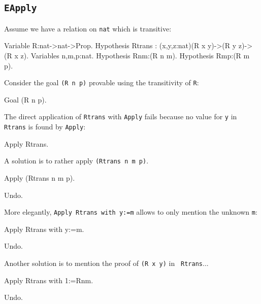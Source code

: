 \begin{coq_example*}
\section{\tt EApply}
\label{EApply-example}
\Example
Assume we have a relation on {\tt nat} which is transitive:

\begin{coq_example*}
Variable R:nat->nat->Prop.
Hypothesis Rtrans : (x,y,z:nat)(R x y)->(R y z)->(R x z).
Variables n,m,p:nat.
Hypothesis Rnm:(R n m).
Hypothesis Rmp:(R m p).
\end{coq_example*}

Consider the goal {\tt (R n p)} provable using the transitivity of
{\tt R}:

\begin{coq_example*}
Goal (R n p).
\end{coq_example*}

The direct application of {\tt Rtrans} with {\tt Apply} fails because
no value for {\tt y} in {\tt Rtrans} is found by {\tt Apply}:

\begin{coq_example}
Apply Rtrans.
\end{coq_example}

A solution is to rather apply {\tt (Rtrans n m p)}.

\begin{coq_example}
Apply (Rtrans n m p).
\end{coq_example}

\begin{coq_eval}
  Undo.
\end{coq_eval}

More elegantly, {\tt Apply Rtrans with y:=m} allows to only mention
the unknown {\tt m}:

\begin{coq_example}
Apply Rtrans with y:=m.
\end{coq_example}

\begin{coq_eval}
  Undo.
\end{coq_eval}

Another solution is to mention the proof of {\tt (R x y)} in {\tt
Rtrans}...

\begin{coq_example}
Apply Rtrans with 1:=Rnm.
\end{coq_example}

\begin{coq_eval}
  Undo.
\end{coq_eval}


\end{coq_example*}
